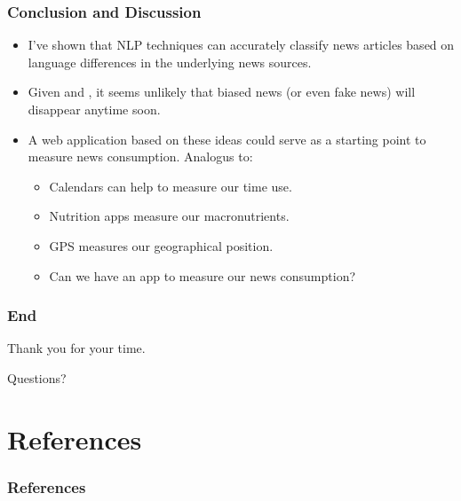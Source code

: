 \documentclass{beamer}
\begin{document}
     \begin{frame}
    	\frametitle{Conclusion and Discussion}
    	\begin{itemize}
    		\item I've shown that NLP techniques can accurately classify news articles based on language differences in the underlying news sources. 
    		\item Given \citet{gentzkow2008competition} and \citet{gentzkow2006media}, it seems unlikely that biased news (or even fake news) will disappear anytime soon. 
    		\item A web application based on these ideas could serve as a starting point to measure news consumption. Analogus to: 
    		\begin{itemize}
    			\item Calendars can help to measure our time use.
    			\item Nutrition apps measure our macronutrients. 
    			\item GPS measures our geographical position.
    			\item Can we have an app to measure our news consumption? 
    		\end{itemize} 
    	\end{itemize}
    \end{frame}

    \begin{frame}
    	\frametitle{End}
    	\centering \Huge Thank you for your time.
    	
    	\centering Questions?
    \end{frame}


\section{References}
    \begin{frame}
    	\frametitle{References}
    	
    	
    \end{frame}
\end{document}
